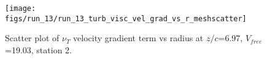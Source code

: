 \begin{figure}[H]
\centering
\texttt{[image: figs/run\_13/run\_13\_turb\_visc\_vel\_grad\_vs\_r\_meshscatter]}
\caption{Scatter plot of $\nu_T$ velocity gradient term vs radius at $z/c$=6.97, $V_{free}$=19.03, station 2.}
\label{fig:run_13_turb_visc_vel_grad_vs_r_meshscatter}
\end{figure}


